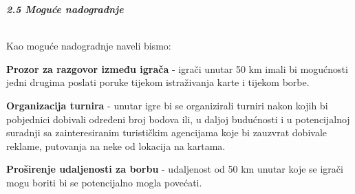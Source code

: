 		\textbf{\textit{\large 2.5 Moguće nadogradnje}}\\ \\ 
		{Kao moguće nadogradnje naveli bismo:
		\begin{packed_item}
			\item {\textbf{Prozor za razgovor između igrača} - igrači unutar 50 km imali bi mogućnosti jedni drugima poslati poruke tijekom istraživanja karte i tijekom borbe.}\\
			\item {\textbf{Organizacija turnira} - unutar igre bi se organizirali turniri nakon kojih bi pobjednici dobivali određeni broj bodova ili, u daljoj budućnosti i u potencijalnoj suradnji sa zainteresiranim turističkim agencijama koje bi zauzvrat dobivale reklame, putovanja na neke od lokacija na kartama.}\\
			\item {\textbf{Proširenje udaljenosti za borbu} - udaljenost od 50 km unutar koje se igrači mogu boriti bi se potencijalno mogla povećati.}
	\end{packed_item} }
		
		
		\eject
	